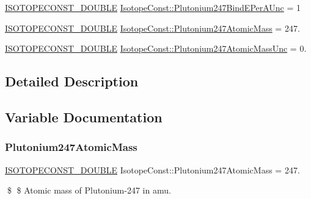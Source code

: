 \begin{DoxyCompactItemize}
\mbox{\hyperlink{group___isotope_const-_macros_ga8f45a7272ce02c0b4c65c44636ed719a}{I\+S\+O\+T\+O\+P\+E\+C\+O\+N\+S\+T\+\_\+\+D\+O\+U\+B\+LE}} \mbox{\hyperlink{group___isotope_const-_plutonium-_pu247_gac2c454e91f69675a39ff008f379810db}{Isotope\+Const\+::\+Plutonium247\+Bind\+E\+Per\+A\+Unc}} = 1
\item 
\mbox{\hyperlink{group___isotope_const-_macros_ga8f45a7272ce02c0b4c65c44636ed719a}{I\+S\+O\+T\+O\+P\+E\+C\+O\+N\+S\+T\+\_\+\+D\+O\+U\+B\+LE}} \mbox{\hyperlink{group___isotope_const-_plutonium-_pu247_ga15f836a30c08f50d6fd79d52751fede3}{Isotope\+Const\+::\+Plutonium247\+Atomic\+Mass}} = 247.
\item 
\mbox{\hyperlink{group___isotope_const-_macros_ga8f45a7272ce02c0b4c65c44636ed719a}{I\+S\+O\+T\+O\+P\+E\+C\+O\+N\+S\+T\+\_\+\+D\+O\+U\+B\+LE}} \mbox{\hyperlink{group___isotope_const-_plutonium-_pu247_ga3c78049e9118f9a64ec3b979c41d453d}{Isotope\+Const\+::\+Plutonium247\+Atomic\+Mass\+Unc}} = 0.
\end{DoxyCompactItemize}


\subsection{Detailed Description}


\subsection{Variable Documentation}
\mbox{\label{group___isotope_const-_plutonium-_pu247_ga15f836a30c08f50d6fd79d52751fede3}} 
\subsubsection{\texorpdfstring{Plutonium247\+Atomic\+Mass}{Plutonium247AtomicMass}}
{\footnotesize\ttfamily \mbox{\hyperlink{group___isotope_const-_macros_ga8f45a7272ce02c0b4c65c44636ed719a}{I\+S\+O\+T\+O\+P\+E\+C\+O\+N\+S\+T\+\_\+\+D\+O\+U\+B\+LE}} Isotope\+Const\+::\+Plutonium247\+Atomic\+Mass = 247.}

\$ \$ Atomic mass of Plutonium-\/247 in amu. \mbox{\label{group___isotope_const-_plutonium-_pu247_ga3c78049e9118f9a64ec3b979c41d453d}} 
